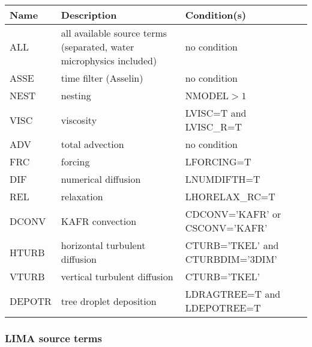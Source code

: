 \begin{longtable} {|p{}|p{}|p{}|}
\hline
Name & Description & Condition(s) \\
\hline \hline
\endhead
ALL    & all available source terms (separated,  water microphysics included) & no condition \\\hline \hline
ASSE   & time filter (Asselin)          & no condition                     \\\hline
NEST   & nesting                        & NMODEL$>1$                       \\\hline
VISC   & viscosity                      & LVISC=T and LVISC\_R=T           \\\hline
ADV    & total advection                & no condition                     \\\hline
FRC    & forcing                        & LFORCING=T                       \\\hline
DIF    & numerical diffusion            & LNUMDIFTH=T                      \\\hline
REL    & relaxation                     & LHORELAX\_RC=T                   \\\hline
DCONV  & KAFR convection                & CDCONV='KAFR' or CSCONV='KAFR'   \\\hline
HTURB  & horizontal turbulent diffusion & CTURB='TKEL' and CTURBDIM='3DIM' \\\hline
VTURB  & vertical turbulent diffusion   & CTURB='TKEL'                     \\\hline
DEPOTR & tree droplet deposition        & LDRAGTREE=T and LDEPOTREE=T      \\\hline
\end{longtable}

\subsubsection{LIMA source terms}

